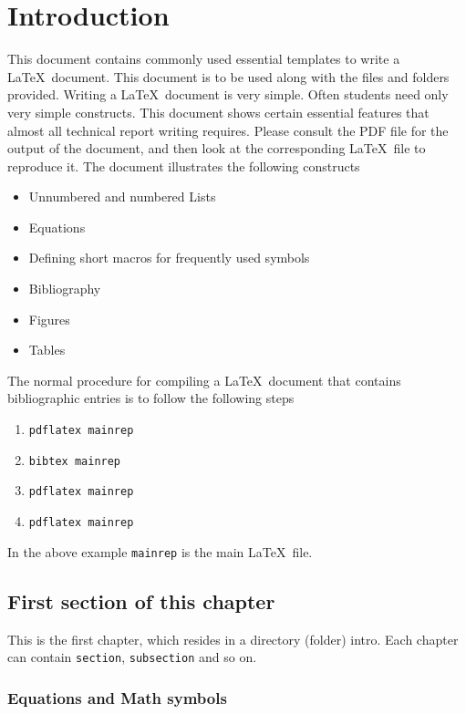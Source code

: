 \newcommand{\etas}{\ensuremath{\eta_{\mathrm{s}}}}

\chapter{Introduction}


This document contains commonly used essential templates to write a
\LaTeX\ document. This document is to be used along with the files and
folders provided. Writing a \LaTeX\ document is very simple.  Often
students need only very simple constructs.  This document shows
certain essential features that almost all technical report writing
requires. Please consult the PDF file for the output of the document,
and then look at the corresponding \LaTeX\ file to reproduce it.  The
document illustrates the following constructs
\begin{itemize}
\item Unnumbered and numbered Lists
\item Equations
\item Defining short macros for frequently used symbols
\item Bibliography
\item Figures
\item Tables
\end{itemize}

The normal procedure for compiling a \LaTeX\ document that contains
bibliographic entries is to follow the following steps
\begin{enumerate}
\item \verb|pdflatex mainrep|
\item \verb|bibtex mainrep|
\item \verb|pdflatex mainrep|
\item \verb|pdflatex mainrep|
\end{enumerate}
In the above example \verb|mainrep| is the main \LaTeX\ file.


\section{First section of this chapter}

This is the first chapter, which resides in a directory (folder)
intro. Each chapter can contain \verb|section|, \verb|subsection|
and so on.

\subsection{Equations and Math symbols}


